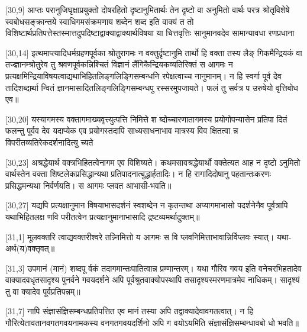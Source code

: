 [30,9] आप्तः परानुजिघृक्षाप्रयुक्तो%
दोषरहितो दृष्टानुमितार्थः %
तेन दृष्टो वा अनुमितो वार्थः%
परत्र श्रोतृविशेषे स्वबोधसङ्क्रान्तये स्वाधिगमसंक्रमणाय शब्देन %
शब्द इति वाक्यं त%
तो विशिष्टार्थप्रतिपत्तेस्तस्मात्तदुपदिष्टाद्वाक्याद्वाक्यार्थविषया या चित्तवृत्तिः सानुमानवदेव सामान्यावधा%
रणप्रधाना

[30,14] इत्थमाप्त्यादिधर्मग्रहणपूर्वका%
श्रोतुरागमः न वक्तुर्दृष्टानुमि%
तार्थो हि वक्ता तस्य लैङ्%
गिकमैन्द्रियकं वा तज्ज्ञानम्श्रोतुरेव तु श्रवणपूर्वकन्निश्चितं%
विज्ञानं लैंगिकैन्द्रियकव्यतिरिक्तं स %
आगमः न प्रत्यक्षमिन्द्रियाविषयत्वाद्यथाभिहितलिङ्गलिङ्गिसम्बन्धनि%
रपेक्षत्वाच्च नानुमानम्। न हि स्वर्गा%
पूर्व%
देव%
तादिशब्दार्था%
न्वितं ज्ञानमासादितलिङ्गलिङ्गिसम्बन्धपु%
रस्सरमुपजायते। फलं तु सर्वत्र प%
उरुषेयो%
वृत्तिबोध एव॥

[30,20] यस्यागमस्य %
वक्तागमाख्यवृत्त्युत्पत्ति%
निमित्ते %
श%
ब्दोच्चारणातागमस्य प्रयोगोपन्यासेन प्रतिपा%
दितं फलन्तु पूर्वव%
देव यदाप्येक %
एव प्रयोगस्तदापि साध्यसाधनाभाव%
मात्रस्य विव%
क्षितत्वा%
न्न विपरीतव्यतिरेकदर्शनादित्यु%
च्यते

[30,23] अश्रद्धेयार्थ%
वक्त्रभिहितत्वेनागम एव विशिष्यते। कथमसावश्रद्धेयार्थो वक्तेत्यत आह न दृष्टो%
ऽनुमितो वार्थस्तेन वक्ता शिष्टलेकप्रसिद्धान्यथा%
 प्रतिपादनात्बुद्धार्हतादिः। न हि %
रागादिदोषानु%
पहतान्तःकरणः प्रसिद्धमन्यथा निर्वर्णयति। स आगमः प्लवत आभासी-भवति॥

[30,27] यद्यपि प्रत्यक्षानुमान%
विषयाभासदर्शनं स्वशब्देन न कृतन्तथा अप्यागमाभासो%
पदर्शनेनैव पूर्वत्रापि यथाभिहितलक्ष%
णवि%
परीतत्वेन प्रत्यक्षानुमानाभासादि द्रष्टव्यमर्थादुक्तम्॥

[31,1] मूलवक्तरि त्वाद्यवक्तरीश्वरे तन्न्निमित्तो य आगमः स वि%
प्लवनिमित्ताभावान्निर्विप्लवः स्यात्। यथा-अर्थ(य)वक्तृवत्॥

[31,3] उपमानं (मानं) %
शब्दपू%
र्वकं तदागमान्तःपातित्वान्न
प्रम्णान्तरम्। यथा गौरिव गवय इति वनेचरभिहतादेव वाक्यादवधृतसादृश्य पुनर्वने गवयदर्शने अपि
पूर्वश्रुतवाक्योपस्थापि%
तसादृश्यस्मरणमात्रमेव नाधिकम्। सादृश्यं तु वा%
क्यादेव पूर्वप्रतिपन्नम्॥

[31,7] नापि संज्ञासंज्ञिसम्बन्धप्रतिपत्तित एव मानं तस्या अपि तद्वाक्यादेवावगतत्वात्। न हि गौरित्येतावतानवगतगवयनामकस्य वनगतगवयदर्शिनो अपि ग%
वयोऽयमिति संज्ञासंज्ञिसम्बन्धावबो%
धो भवति॥

